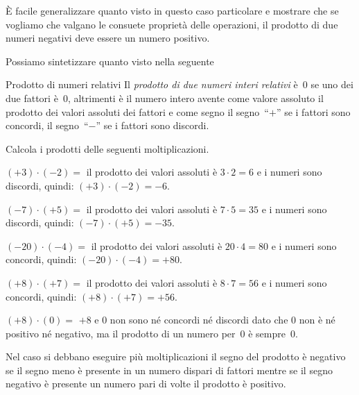 È facile generalizzare quanto visto in questo caso particolare e mostrare che 
se vogliamo che valgano le consuete proprietà delle operazioni, il prodotto 
di due numeri negativi deve essere un numero positivo.

Possiamo sintetizzare quanto visto nella seguente

\begin{definizione}{Prodotto di numeri relativi}{}
Il \emph{prodotto di due numeri interi relativi} è~0 se uno dei due 
fattori è~0, altrimenti è il numero intero avente 
come valore assoluto il prodotto dei valori assoluti dei fattori e 
come segno 
il segno~``\(+\)'' se i fattori sono concordi,
il segno~``\(-\)'' se i fattori sono discordi.
\end{definizione}

\begin{esempio}{}{}
Calcola i prodotti delle seguenti moltiplicazioni.
\begin{enumeratea}
\item \((+3) \cdot (-2)=\) 
il prodotto dei valori assoluti è \(3 \cdot 2 = 6\) 
e i numeri sono discordi, quindi: \((+3) \cdot (-2) = -6\).
\item \((-7) \cdot (+5) =\) 
il prodotto dei valori assoluti è \(7 \cdot 5 = 35\) 
e i numeri sono discordi, quindi: \((-7) \cdot (+5) = -35\).
\item \((-20) \cdot (-4) =\) 
il prodotto dei valori assoluti è \(20 \cdot 4 = 80\) 
e i numeri sono concordi, quindi: \((-20) \cdot (-4) = +80\).
\item \((+8) \cdot (+7) =\) 
il prodotto dei valori assoluti è \(8 \cdot 7 = 56\) 
e i numeri sono concordi, quindi: \((+8) \cdot (+7) = +56\).
\item \((+8) \cdot (0) =\) 
\(+8\) e  \(0\) non sono né concordi né discordi dato che 0 non è né 
positivo né negativo, ma il prodotto di un numero per~0 è sempre~0.
\end{enumeratea}
\end{esempio}


Nel caso si debbano eseguire più moltiplicazioni il segno del prodotto è 
negativo se il segno meno è presente in un numero dispari di fattori 
mentre se il segno negativo è presente un numero pari di volte il prodotto 
è positivo.

